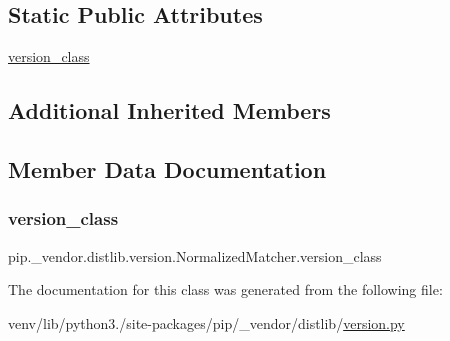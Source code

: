 \subsection*{Static Public Attributes}
\begin{DoxyCompactItemize}
\item 
\hyperlink{classpip_1_1__vendor_1_1distlib_1_1version_1_1NormalizedMatcher_ac1112f941015eaec950abec4f174262f}{version\+\_\+class}
\end{DoxyCompactItemize}
\subsection*{Additional Inherited Members}


\subsection{Member Data Documentation}
\mbox{\label{classpip_1_1__vendor_1_1distlib_1_1version_1_1NormalizedMatcher_ac1112f941015eaec950abec4f174262f}} 
\subsubsection{\texorpdfstring{version\+\_\+class}{version\_class}}
{\footnotesize\ttfamily pip.\+\_\+vendor.\+distlib.\+version.\+Normalized\+Matcher.\+version\+\_\+class\hspace{0.3cm}{\ttfamily [static]}}



The documentation for this class was generated from the following file\+:\begin{DoxyCompactItemize}
\item 
venv/lib/python3./site-\/packages/pip/\+\_\+vendor/distlib/\hyperlink{pip_2__vendor_2distlib_2version_8py}{version.\+py}\end{DoxyCompactItemize}
